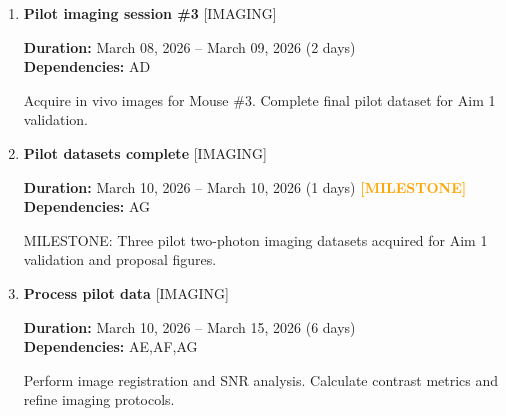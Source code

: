 \documentclass[landscape,a4paper]{article}
\begin{document}
\begin{enumerate}[leftmargin=1.5cm, itemsep=1em, parsep=0.5em]
    \item \textcolor{other}{\textbf{\large Pilot imaging session \#3}}
          \hfill \textcolor{black!60}{\small [IMAGING]}
          
          \vspace{0.2em}
          \textcolor{black!70}{\textbf{Duration:} March 08, 2026 -- March 09, 2026 (2 days)}
          \\[0.2em]\textcolor{black!70}{\textbf{Dependencies:} AD}\n
          \vspace{0.4em}
          \begin{minipage}[t]{0.9\textwidth}
          \textcolor{black!85}{Acquire in vivo images for Mouse \#3. Complete final pilot dataset for Aim 1 validation.}
          \end{minipage}

    \item \textcolor{other}{\textbf{\large Pilot datasets complete}}
          \hfill \textcolor{black!60}{\small [IMAGING]}
          
          \vspace{0.2em}
          \textcolor{black!70}{\textbf{Duration:} March 10, 2026 -- March 10, 2026 (1 days)}
          \textcolor{orange}{\textbf{ [MILESTONE]}}\n          \\[0.2em]\textcolor{black!70}{\textbf{Dependencies:} AG}\n
          \vspace{0.4em}
          \begin{minipage}[t]{0.9\textwidth}
          \textcolor{black!85}{MILESTONE: Three pilot two-photon imaging datasets acquired for Aim 1 validation and proposal figures.}
          \end{minipage}

    \item \textcolor{other}{\textbf{\large Process pilot data}}
          \hfill \textcolor{black!60}{\small [IMAGING]}
          
          \vspace{0.2em}
          \textcolor{black!70}{\textbf{Duration:} March 10, 2026 -- March 15, 2026 (6 days)}
          \\[0.2em]\textcolor{black!70}{\textbf{Dependencies:} AE,AF,AG}\n
          \vspace{0.4em}
          \begin{minipage}[t]{0.9\textwidth}
          \textcolor{black!85}{Perform image registration and SNR analysis. Calculate contrast metrics and refine imaging protocols.}
          \end{minipage}


\end{enumerate}
\end{document}

